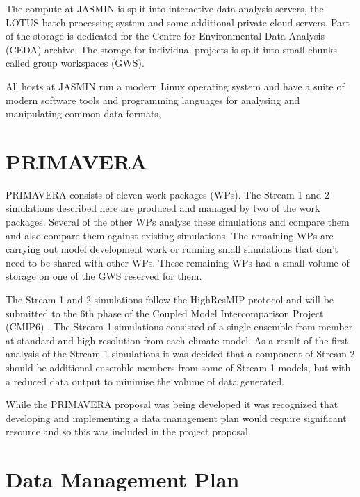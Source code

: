 \documentclass[gmd, manuscript]{copernicus}
\begin{document}
The compute at JASMIN is split into interactive data analysis servers, the LOTUS batch processing system and some additional private cloud servers. Part of the storage is dedicated for the Centre for Environmental Data Analysis (CEDA) archive. The storage for individual projects is split into small chunks called group workspaces (GWS).

All hosts at JASMIN run a modern Linux operating system and have a suite of modern software tools and programming languages for analysing and manipulating common data formats,

\section{PRIMAVERA}

PRIMAVERA consists of eleven work packages (WPs). The Stream 1 and 2 simulations described here are produced and managed by two of the work packages. Several of the other WPs analyse these simulations and compare them and also compare them against existing simulations. The remaining WPs are carrying out model development work or running small simulations that don't need to be shared with other WPs. These remaining WPs had a small volume of storage on one of the GWS reserved for them.

The Stream 1 and 2 simulations follow the HighResMIP protocol and will be submitted to the 6th phase of the Coupled Model Intercomparison Project (CMIP6) \citep{Eyring2016}. The Stream 1 simulations consisted of a single ensemble from member at standard and high resolution from each climate model. As a result of the first analysis of the Stream 1 simulations it was decided that a component of Stream 2 should be additional ensemble members from some of Stream 1 models, but with a reduced data output to minimise the volume of data generated.

While the PRIMAVERA proposal was being developed it was recognized that developing and implementing a data management plan would require significant resource and so this was included in the project proposal.


\section{Data Management Plan}

\end{document}
